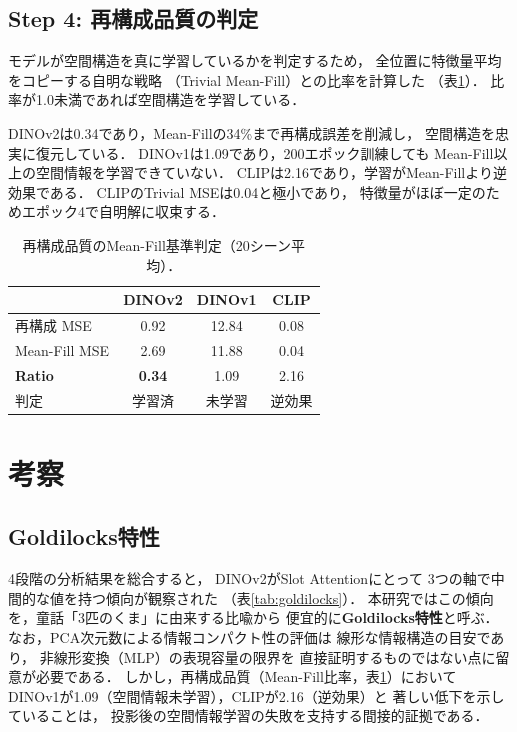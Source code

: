 \documentclass[dvipdfmx,twocolumn]{jarticle}
\begin{document}
\subsection{Step 4: 再構成品質の判定}

モデルが空間構造を真に学習しているかを判定するため，
全位置に特徴量平均をコピーする自明な戦略
（Trivial Mean-Fill）との比率を計算した
（表\ref{tab:reconstruction}）．
比率が1.0未満であれば空間構造を学習している．

DINOv2は0.34であり，Mean-Fillの34\%まで再構成誤差を削減し，
空間構造を忠実に復元している．
DINOv1は1.09であり，200エポック訓練しても
Mean-Fill以上の空間情報を学習できていない．
CLIPは2.16であり，学習がMean-Fillより逆効果である．
CLIPのTrivial MSEは0.04と極小であり，
特徴量がほぼ一定のためエポック4で自明解に収束する．

\begin{table}[t]
\centering
\caption{再構成品質のMean-Fill基準判定（20シーン平均）．}
\label{tab:reconstruction}
\small
\begin{tabular}{lccc}
\toprule
 & DINOv2 & DINOv1 & CLIP \\
\midrule
再構成 MSE & 0.92 & 12.84 & 0.08 \\
Mean-Fill MSE & 2.69 & 11.88 & 0.04 \\
\textbf{Ratio} & \textbf{0.34} & 1.09 & 2.16 \\
判定 & 学習済 & 未学習 & 逆効果 \\
\bottomrule
\end{tabular}
\end{table}

\section{考察}

\subsection{Goldilocks特性}

4段階の分析結果を総合すると，
DINOv2がSlot Attentionにとって
3つの軸で中間的な値を持つ傾向が観察された
（表\ref{tab:goldilocks}）．
本研究ではこの傾向を，童話「3匹のくま」に由来する比喩から
便宜的に\textbf{Goldilocks特性}と呼ぶ．
なお，PCA次元数による情報コンパクト性の評価は
線形な情報構造の目安であり，
非線形変換（MLP）の表現容量の限界を
直接証明するものではない点に留意が必要である．
しかし，再構成品質（Mean-Fill比率，表\ref{tab:reconstruction}）において
DINOv1が1.09（空間情報未学習），CLIPが2.16（逆効果）と
著しい低下を示していることは，
投影後の空間情報学習の失敗を支持する間接的証拠である．
\end{document}
